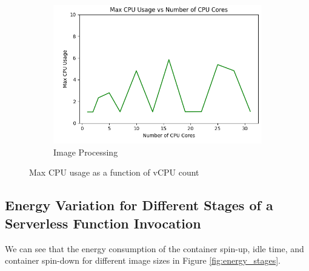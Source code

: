 \documentclass[times, 10pt,twocolumn]{article}
\begin{document}
\begin{figure}[ht]
\begin{subfigure}[b]{0.33\textwidth}
      \includegraphics[width=\textwidth]{imgs/study_1_results/var_cpu/imageprocess/CPU_CPUUsage.png}
     \caption{Image Processing}
     \label{fig:image_max_cpu}
   \end{subfigure}
   \caption{Max CPU usage as a function of vCPU count}
   \label{fig:max_cpu} %
\end{figure}




 \subsection{Energy Variation for Different Stages of a Serverless Function Invocation}
 \label{appendix:energy_variation_vcpu_memory}
 We can see that the energy consumption of the container spin-up, idle time, and container spin-down for different image sizes in Figure \ref{fig:energy_stages}. 
\end{document}
